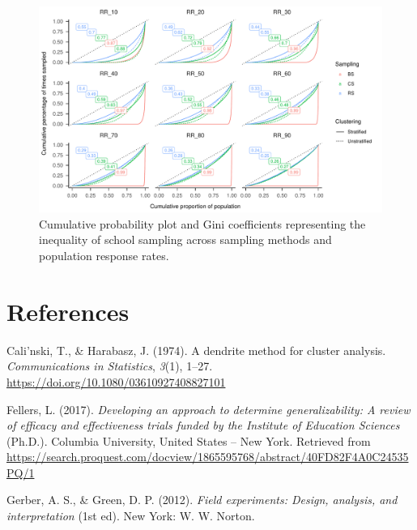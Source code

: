 \documentclass[english,man,floatsintext]{apa6}
\begin{document}
\begin{figure}
\includegraphics{6---Paper_files/figure-latex/fig-gini-curve-1} \caption{Cumulative probability plot and Gini coefficients representing the inequality of school sampling across sampling methods and population response rates.}\label{fig:fig-gini-curve}
\end{figure}

\newpage

\hypertarget{references}{%
\section{References}\label{references}}

\begingroup
\setlength{\parindent}{-0.5in}
\setlength{\leftskip}{0.5in}

\hypertarget{refs}{}
\leavevmode\hypertarget{ref-calinskiDendriteMethodCluster1974}{}%
Cali\a'nski, T., \& Harabasz, J. (1974). A dendrite method for cluster analysis. \emph{Communications in Statistics}, \emph{3}(1), 1--27. \url{https://doi.org/10.1080/03610927408827101}

\leavevmode\hypertarget{ref-fellersDevelopingApproachDetermine2017}{}%
Fellers, L. (2017). \emph{Developing an approach to determine generalizability: A review of efficacy and effectiveness trials funded by the Institute of Education Sciences} (Ph.D.). Columbia University, United States -- New York. Retrieved from \url{https://search.proquest.com/docview/1865595768/abstract/40FD82F4A0C24535PQ/1}

\leavevmode\hypertarget{ref-gerberFieldExperimentsDesign2012}{}%
Gerber, A. S., \& Green, D. P. (2012). \emph{Field experiments: Design, analysis, and interpretation} (1st ed). New York: W. W. Norton.
\end{document}
